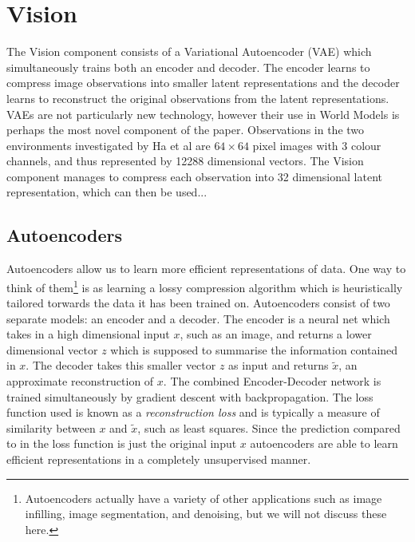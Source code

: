 \documentclass{article}
\numberwithin{figure}{section}
\theoremstyle{definition}
\begin{document}



\section{Vision}
The Vision component consists of a Variational Autoencoder (VAE) which simultaneously trains both an encoder and decoder.
The encoder learns to compress image observations into smaller latent representations and the decoder learns to reconstruct the original observations from the latent representations.
VAEs are not particularly new technology, however their use in World Models is perhaps the most novel component of the paper. %
Observations in the two environments investigated by Ha et al are $64 \times 64$ pixel images with 3 colour channels, and thus represented by 12288 dimensional vectors.
The Vision component manages to compress each observation into 32 dimensional latent representation, which can then be used...



\subsection{Autoencoders}
Autoencoders allow us to learn more efficient representations of data.
One way to think of them\footnote{Autoencoders actually have a variety of other applications such as image infilling, image segmentation, and denoising, but we will not discuss these here.} is as learning a lossy compression algorithm which is heuristically tailored torwards the data it has been trained on.
Autoencoders consist of two separate models: an encoder and a decoder. %
The encoder is a neural net which takes in a high dimensional input $x$, such as an image, and returns a lower dimensional vector $z$ which is supposed to summarise the information contained in $x$.
The decoder takes this smaller vector $z$ as input and returns $\widetilde{x}$, an approximate reconstruction of $x$.
The combined Encoder-Decoder network is trained simultaneously by gradient descent with backpropagation.
The loss function used is known as a \textit{reconstruction loss} and is typically a measure of similarity between $x$ and $\widetilde{x}$, such as least squares.
Since the prediction compared to in the loss function is just the original input $x$ autoencoders are able to learn efficient representations in a completely unsupervised manner.
\end{document}
